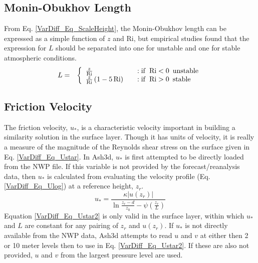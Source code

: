 \subsection{Monin-Obukhov Length}
From Eq. \ref{VarDiff_Eq_ScaleHeight}, the Monin-Obukhov length can be expressed as
a simple function of $z$ and $\mathrm{Ri}$, but empirical studies found that
the expression for $L$ should be separated into one for unstable and one for stable 
atmospheric conditions.
\begin{eqnarray}\label{VarDiff_Eq_MonL}
L &=& \left\{ \begin{array} {l@{\quad \quad}l}
 \frac{z}{\mathrm{Ri}}                 &:  \mathrm{if}\,\,\, \mathrm{Ri}<0 \,\,\, \mathrm{unstable} \\
\frac{z}{\mathrm{Ri}}\left(1-5\,\mathrm{Ri}\right)  &:  \mathrm{if}\,\,\, \mathrm{Ri}>0 \,\,\, \mathrm{stable}
\end{array}
\right.
\end{eqnarray}


\subsection{Friction Velocity}
The friction velocity, $u_*$, is a characteristic velocity important in building a similarity
solution in the surface layer. Though it has units of velocity, it is really a measure
of the magnitude of the Reynolds shear stress on the surface given in Eq. \ref{VarDiff_Eq_Ustar}.
In Ash3d, $u_*$ is first attempted to be directly loaded from the NWP file. If this variable is not
provided by the forecast/reanalysis data, then $u_*$ is calculated from evaluating the velocity
profile (Eq. \ref{VarDiff_Eq_Ulog}) at a reference height, $z_r$.
\begin{equation}\label{VarDiff_Eq_Ustar2}
u_* = \frac{\kappa |u(z_r)|}{\ln \frac{z_r-d}{z_0} - \psi(\frac{z_r}{L})}
\end{equation}
Equation \ref{VarDiff_Eq_Ustar2} is only valid in the surface layer, within which
$u_*$ and $L$ are constant for any pairing of $z_r$ and $u(z_r)$. If $u_*$ is not directly available
from the NWP data, Ash3d attempts to read $u$ and $v$ at either then 2 or 10 meter levels then to
use in Eq. \ref{VarDiff_Eq_Ustar2}. If these are also not provided, $u$ and $v$ from the largest
pressure level are used.


